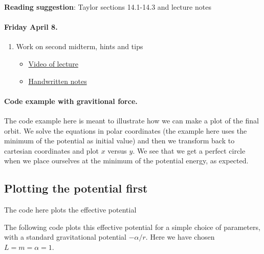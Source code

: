 \documentclass[%
oneside,                 %
final,                   %
10pt]{article}
\begin{document}
\noindent
\textbf{Reading suggestion}: Taylor sections 14.1-14.3 and lecture notes

\paragraph{Friday April 8.}
\begin{enumerate}
\item Work on second midterm, hints and tips
\begin{itemize}

  \item \href{{https://youtu.be/tIO5OWGZ76c}}{Video of lecture}

  \item \href{{https://github.com/mhjensen/Physics321/blob/master/doc/HandWrittenNotes/Spring2022/NotesApril8.pdf}}{Handwritten notes}
\end{itemize}

\noindent
\end{enumerate}

\noindent
\paragraph{Code example with gravitional force.}
The code example here is meant to illustrate how we can make a plot of
the final orbit. We solve the equations in polar coordinates (the
example here uses the minimum of the potential as initial value) and
then we transform back to cartesian coordinates and plot $x$ versus
$y$. We see that we get a perfect circle when we place ourselves at
the minimum of the potential energy, as expected.

\subsection*{Plotting the potential first}

The code here plots the effective potential

The following code plots this effective potential for a simple choice of parameters, with a standard gravitational potential $-\alpha/r$. Here we have chosen $L=m=\alpha=1$. 
\end{document}
